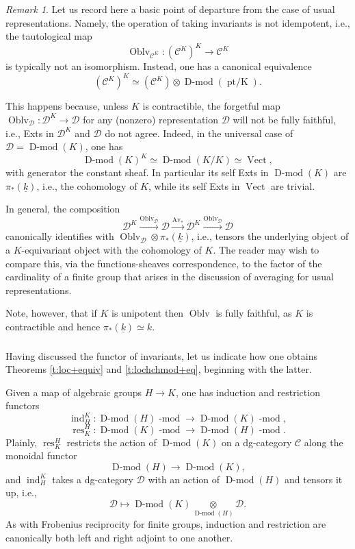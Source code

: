 \documentclass[10pt]{amsart}
\newcommand{\on}{\operatorname}
\renewcommand{\mod}{\on{-mod}}
\newcommand{\Dmod}{\on{D-mod}}
\newcommand{\Vect}{\on{Vect}}
\theoremstyle{remark}
\newtheorem{re}[subsubsection]{Remark}
\newcommand{\sD}{\mathscr{D}}
\numberwithin{equation}{section}
\newcommand{\sC}{\mathscr{C}}
\renewcommand{\mod}{\operatorname{-mod}}
\begin{document}
\begin{re}\label{r:invariantstwice}Let us record here a basic point of departure from the case of usual 
representations. Namely, the operation of taking invariants is not 
idempotent, i.e., the tautological map 
%
\[
   \on{Oblv}_{\sC^K}: (\sC^K)^K \rightarrow \sC^K
\]
%
is typically not an isomorphism. Instead, one has a canonical equivalence 
%
\[
   (\sC^K)^K \simeq (\sC^K) \otimes \Dmod(\on{pt/K}).
\]
%

This happens because, unless $K$ is 
contractible, the forgetful map $\on{Oblv}_{\sD}: \sD^K \rightarrow \sD$ for any (nonzero) representation $\sD$
will not be 
fully faithful, i.e., Exts in $\sD^K$ and $\sD$ do not agree. Indeed, in the universal case of $\sD = \Dmod(K)$, one has 
%
\[
\Dmod(K)^K \simeq \Dmod(K / K) \simeq \Vect,
\]
%
with generator the constant sheaf. In particular its self Exts in $\Dmod(K)$ are $\pi_*(\underline{k})$, i.e., the cohomology of $K$, while its self Exts in $\Vect$ are trivial. 


In general, the 
composition 
%
\[
    \sD^K \xrightarrow{\on{Oblv}_{\sD}} \sD \xrightarrow{\on{Av}_*} \sD^K 
    \xrightarrow{\on{Oblv}_{\sD}} \sD
\]
%
canonically identifies with $\on{Oblv}_{\sD} \otimes \pi_*(\underline{k})$, i.e., 
tensors the underlying object of a $K$-equivariant object with the cohomology 
of $K$. The reader may wish to compare this, via the functions-sheaves correspondence, 
to the factor of the cardinality of a finite group that arises in the 
discussion of averaging for usual representations. 

Note, however, that if $K$ is unipotent then $\on{Oblv}$ is fully 
faithful, as $K$ is contractible and hence $\pi_*(\underline{k}) \simeq k$. \end{re}




\subsubsection{} Having discussed the functor of invariants, let us indicate how one obtains Theorems \ref{t:loc+equiv} and \ref{t:lochchmod+eq}, beginning with the latter. 


Given a map of algebraic groups $H \rightarrow K$, one has 
induction and restriction functors 
%
\[
  \on{ind}_H^K: \Dmod(H)\mod \rightarrow \Dmod(K)\mod, 
\] 
%
%
\[
  \on{res}_K^H: \Dmod(K)\mod \rightarrow \Dmod(H)\mod.
\]
%
Plainly, $\on{res}_K^H$ restricts the action of $\Dmod(K)$ on a dg-category 
$\sC$ along the monoidal functor 
%
\[
         \Dmod(H) \rightarrow \Dmod(K),
\]
%
and $\on{ind}_H^K$ takes a dg-category $\sD$ with an action of $\Dmod(H)$ and 
tensors it up, i.e., 
%
\[
      \sD \mapsto \Dmod(K) \underset{ \Dmod(H) } \otimes \sD. 
\]
%
As with Frobenius reciprocity for finite groups, induction and restriction are 
canonically both left and right adjoint to one another. 
\end{document}
